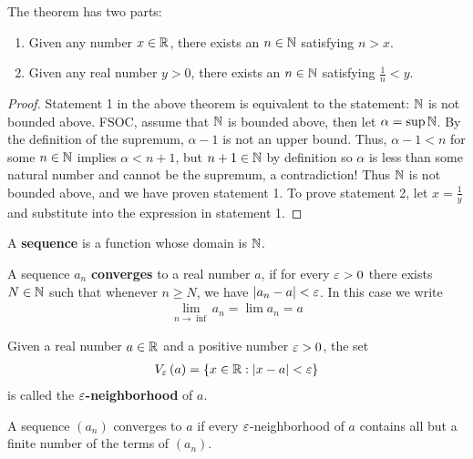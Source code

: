 \begin{theorem}
	The theorem has two parts:
	\begin{enumerate}
		\item Given any number $x \in \mathbb{R}$, there exists an $n \in \mathbb{N}$ satisfying $n > x$.
		\item Given any real number  $y>0$, there exists an $n \in \mathbb{N}$ satisfying $\frac{1}{n} < y$.
	\end{enumerate}
\end{theorem}

\begin{proof}
	Statement 1 in the above theorem is equivalent to the statement: $\mathbb{N}$ is not bounded above. FSOC, assume that $\mathbb{N}$ is bounded above, then let $\alpha = \sup \mathbb{N}$. By the definition of the supremum, $\alpha - 1$ is not an upper bound. Thus, $\alpha - 1 < n$ for some $n \in \mathbb{N}$ implies $\alpha < n + 1$, but $n+1 \in \mathbb{N}$ by definition so $\alpha$ is less than some natural number and cannot be the supremum, a contradiction! Thus $\mathbb{N}$ is not bounded above, and we have proven statement 1. To prove statement 2, let $x = \frac{1}{y}$ and substitute into the expression in statement 1.
\end{proof}

\begin{definition}[Sequence]
	A \textbf{sequence} is a function whose domain is  $\mathbb{N}$.
\end{definition}

\begin{definition}
	A sequence $a_n$ \textbf{converges} to a real number $a$, if for every $\e > 0$ there exists $N \in \mathbb{N}$ such that whenever $n \ge N$, we have $\left|a_n - a\right| < \e$. In this case we write
	\begin{align}
		\lim_{n \to \inf} a_n = \lim_{} a_n = a
	\end{align} 
\end{definition}

\begin{definition}[$\e$-Neighborhood]
	Given a real number $a \in \mathbb{R}$ and a positive number $\e > 0$, the set
	\begin{align}
		V_{\e} \left( a \right)  = \{x \in \R : \left|x - a\right| < \e\} 
	\end{align}
	is called the \textbf{$\e$-neighborhood} of $a$. 
\end{definition}

\begin{definition}
	A sequence $\left( a_n \right) $ converges to $a$ if every $\e$-neighborhood of $a$ contains all but a finite number of the terms of $\left( a_n \right) $.
\end{definition}

